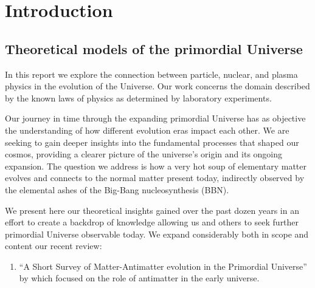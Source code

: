 \section{Introduction}
\subsection{Theoretical models of the primordial Universe}\label{ssec:UniLab}
In this report we explore the connection between particle, nuclear, and plasma physics in the evolution of the Universe. Our work concerns the domain described by the known laws of physics as determined by laboratory experiments.

Our journey in time through the expanding primordial Universe has as objective the understanding of how different evolution eras impact each other. We are seeking to gain deeper insights into the fundamental processes that shaped our cosmos, providing a clearer picture of the universe's origin and its ongoing expansion. The question we address is how a very hot soup of elementary matter evolves and connects to the normal matter present today, indirectly observed by the elemental ashes of the Big-Bang nucleosynthesis (BBN). 

We present here our theoretical insights gained over the past dozen years in an effort to create a backdrop of knowledge allowing us and others to seek further primordial Universe observable today. We expand considerably both in scope and content our recent review:
\begin{enumerate}
\item ``A Short Survey of Matter-Antimatter evolution in the Primordial Universe'' by  which focused on the role of antimatter in the early universe. 
\end{enumerate}

